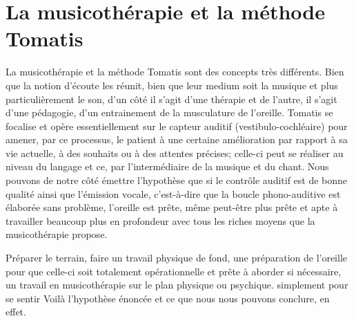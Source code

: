 \section{La musicothérapie et la méthode Tomatis}

La musicothérapie et la méthode Tomatis sont des concepts très différents. Bien que la notion d'écoute les réunit, bien que leur medium soit la musique et plus particulièrement le son, d'un côté il s'agit d'une thérapie et de l'autre, il s'agit d'une pédagogie, d'un entrainement de la musculature de l'oreille. 
Tomatis se focalise et opère essentiellement sur le capteur auditif (vestibulo-cochléaire) pour amener, par ce processus, le patient à une certaine  amélioration par rapport à sa vie actuelle, à des souhaits ou à des attentes précises; celle-ci peut se réaliser au niveau du langage et ce, par l'intermédiaire de la musique et du chant. Nous pouvons de notre côté  émettre l'hypothèse que si le contrôle auditif est de bonne qualité ainsi que l'émission vocale, c'est-à-dire que la boucle phono-auditive est élaborée sans problème, l'oreille est prête, même peut-être plus prête et apte à travailler beaucoup plus en profondeur avec tous les riches moyens que la musicothérapie propose.


Préparer le terrain, faire un travail physique de fond, une préparation de l'oreille pour que celle-ci soit totalement opérationnelle et prête à aborder si nécessaire, un travail en musicothérapie sur le plan physique ou psychique. simplement pour se sentir 
Voilà l'hypothèse énoncée et ce que nous nous pouvons conclure, en effet.